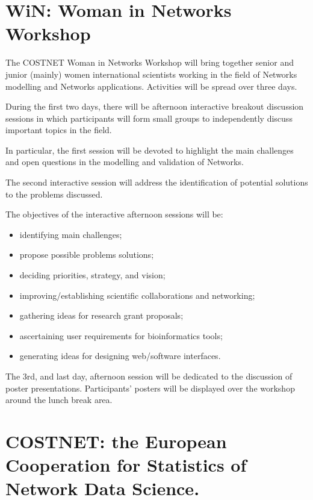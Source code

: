 %
\section{WiN: Woman in Networks Workshop}
The COSTNET Woman in Networks Workshop will bring together senior and junior (mainly) women international scientists working in the field of Networks modelling and Networks applications. Activities will be spread over three days.

During the first two days, there will be afternoon interactive breakout discussion sessions in which participants will form small groups to independently discuss important topics in the field.

In particular, the first session will be devoted to highlight the main challenges and open questions in the modelling and validation of Networks.

The second interactive session will address the identification of potential solutions to the problems discussed.

The objectives of the interactive afternoon sessions will be:
\begin{itemize}
\item identifying main challenges;
\item propose possible problems solutions;
\item deciding priorities, strategy, and vision;
\item improving/establishing scientific collaborations and networking;
\item gathering ideas for research grant proposals;
\item ascertaining user requirements for bioinformatics tools;
\item generating ideas for designing web/software interfaces.
\end{itemize}
The 3rd, and last day, afternoon session will be dedicated to the discussion of poster presentations. Participants' posters will be displayed over the workshop around the lunch break area.

\section{COSTNET: the European Cooperation for Statistics of Network Data Science.}


